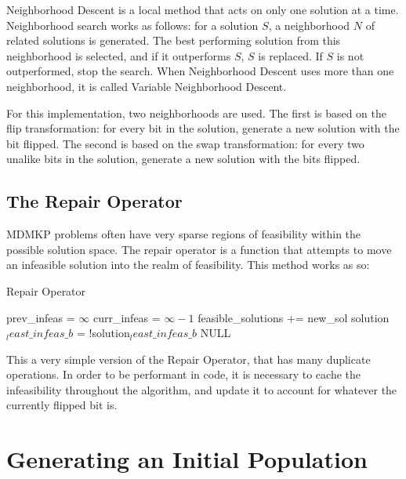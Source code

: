 \documentclass[11pt, letterpaper, onecolumn]{article}
\begin{document}
Neighborhood Descent is a local method that acts on only one solution at a time. Neighborhood search works as follows: for a solution $S$, a neighborhood $N$ of related solutions is generated. The best performing solution from this neighborhood is selected, and if it outperforms $S$, $S$ is replaced. If $S$ is not outperformed, stop the search. When Neighborhood Descent uses more than one neighborhood, it is called Variable Neighborhood Descent. 

For this implementation, two neighborhoods are used. The first is based on the flip transformation: for every bit in the solution, generate a new solution with the bit flipped. The second is based on the swap transformation: for every two unalike bits in the solution, generate a new solution with the bits flipped.  

\subsection{The Repair Operator}

MDMKP problems often have very sparse regions of feasibility within the possible solution space. The repair operator is a function that attempts to move an infeasible solution into the realm of feasibility. This method works as so:  

\begin{algorithm}
\caption{Repair Operator}
\begin{algorithmic}
\STATE prev\_infeas = $\infty$
\STATE curr\_infeas = $\infty-1$
\STATE feasible\_solutions += new\_sol
\ENDIF
\ENDIF
\ENDFOR
{}
\ENDIF
\STATE solution$_least\_infeas\_b$ = !solution$_least\_infeas\_b$
\ENDWHILE
\RETURN NULL
\end{algorithmic}
\end{algorithm}

This a very simple version of the Repair Operator, that has many duplicate operations. In order to be performant in code, it is necessary to cache the infeasibility throughout the algorithm, and update it to account for whatever the currently flipped bit is. 

\section{Generating an Initial Population}
\end{document}
